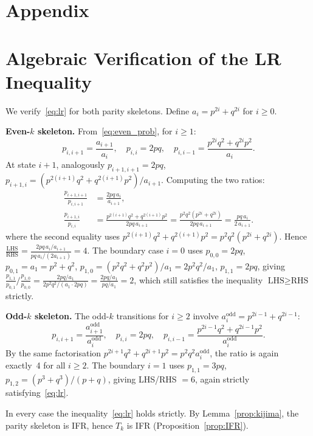 \documentclass[pdflatex,sn-mathphys-num]{sn-jnl}
\theoremstyle{definition}
\numberwithin{equation}{section}
\begin{document}
\section*{Appendix}
\appendix
\section{Algebraic Verification of the LR Inequality}\label{app:lr}

We verify~\eqref{eq:lr} for both parity skeletons. Define $a_i = p^{2i}+q^{2i}$ for $i\ge 0$.

\textbf{Even-$k$ skeleton.} From~\eqref{eq:even_prob}, for $i\ge 1$:
\[
p_{i,i+1} = \frac{a_{i+1}}{a_i},\quad p_{i,i}=2pq,\quad p_{i,i-1}=\frac{p^{2i}q^2+q^{2i}p^2}{a_i}.
\]
At state $i{+}1$, analogously $p_{i+1,i+1}=2pq$, $p_{i+1,i}=(p^{2(i+1)}q^2+q^{2(i+1)}p^2)/a_{i+1}$. Computing the two ratios:
\begin{align*}
\frac{p_{i+1,i+1}}{p_{i,i+1}} &= \frac{2pq\,a_i}{a_{i+1}},\\
\frac{p_{i+1,i}}{p_{i,i}} &= \frac{p^{2(i+1)}q^2+q^{2(i+1)}p^2}{2pq\,a_{i+1}}= \frac{p^2 q^2(p^{2i}+q^{2i})}{2pq\,a_{i+1}} = \frac{pq\,a_i}{2\,a_{i+1}}.
\end{align*}
where the second equality uses $p^{2(i+1)}q^2 + q^{2(i+1)}p^2 = p^2q^2(p^{2i}+q^{2i})$. Hence
$\displaystyle \frac{\text{LHS}}{\text{RHS}} = \frac{2pq\,a_i/a_{i+1}}{pq\,a_i/(2 a_{i+1})} = 4$.
The boundary case $i=0$ uses $p_{0,0}=2pq$, $p_{0,1}=a_1=p^2+q^2$, $p_{1,0}=(p^2q^2+q^2p^2)/a_1=2p^2q^2/a_1$, $p_{1,1}=2pq$, giving
$\displaystyle \frac{p_{1,1}}{p_{0,1}}\bigg/\frac{p_{1,0}}{p_{0,0}} = \frac{2pq/a_1}{2p^2q^2/(a_1\cdot 2pq)} = \frac{2pq/a_1}{pq/a_1} = 2$,
which still satisfies the inequality $\text{LHS}\ge\text{RHS}$ strictly.

\textbf{Odd-$k$ skeleton.} The odd-$k$ transitions for $i\ge 2$ involve $a^{\mathrm{odd}}_i = p^{2i-1}+q^{2i-1}$:
\[
p_{i,i+1} = \frac{a^{\mathrm{odd}}_{i+1}}{a^{\mathrm{odd}}_i},\quad p_{i,i}=2pq,\quad p_{i,i-1}=\frac{p^{2i-1}q^2+q^{2i-1}p^2}{a^{\mathrm{odd}}_i}.
\]
By the same factorisation $p^{2i+1}q^2+q^{2i+1}p^2 = p^2q^2 a^{\mathrm{odd}}_i$, the ratio is again exactly~4 for all $i\ge 2$. The boundary $i=1$ uses $p_{1,1}=3pq$, $p_{1,2}=(p^3+q^3)/(p+q)$, giving LHS/RHS $=6$, again strictly satisfying~\eqref{eq:lr}.

In every case the inequality~\eqref{eq:lr} holds strictly. By Lemma~\ref{prop:kijima}, the parity skeleton is IFR, hence $T_k$ is IFR (Proposition~\ref{prop:IFR}).


\end{document}
